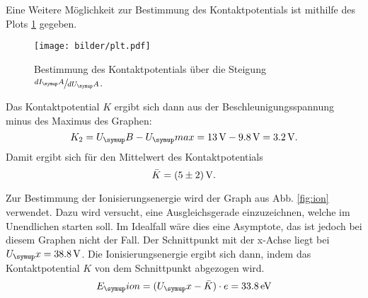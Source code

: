 Eine Weitere Möglichkeit zur Bestimmung des Kontaktpotentials ist mithilfe
des Plots \ref{fig:plot} gegeben.
\begin{figure}
  \centering
  \texttt{[image: bilder/plt.pdf]}
  \caption{Bestimmung des Kontaktpotentials über die Steigung $\sfrac{dI_\su{A}}{dU_\su{A}}$.}
  \label{fig:plot}
\end{figure}
Das Kontaktpotential $K$ ergibt sich dann aus der Beschleunigungsspannung minus
des Maximus des Graphen:
\begin{equation}
  K_2 = U_\su{B} - U_\su{max} = 13\Volt - 9.8\Volt = 3.2\Volt.
\end{equation}
Damit ergibt sich für den Mittelwert des Kontaktpotentials
\begin{equation}
  \bar{K} = (5 \pm 2) \,\si{\volt}.
\end{equation}

Zur Bestimmung der Ionisierungsenergie wird der Graph aus Abb. \ref{fig:ion}
verwendet.
Dazu wird versucht, eine Ausgleichsgerade einzuzeichnen, welche im Unendlichen starten
soll. Im Idealfall wäre dies eine Asymptote, das ist jedoch bei diesem Graphen nicht
der Fall. Der Schnittpunkt mit der x-Achse liegt bei $U_\su{x} = 38.8 \Volt$.
Die Ionisierungsenergie ergibt sich dann, indem das Kontaktpotential $K$ von
dem Schnittpunkt abgezogen wird.
\begin{equation}
  E_\su{ion} = (U_\su{x}-\bar{K}) \cdot e = 33.8\eV
\end{equation}
